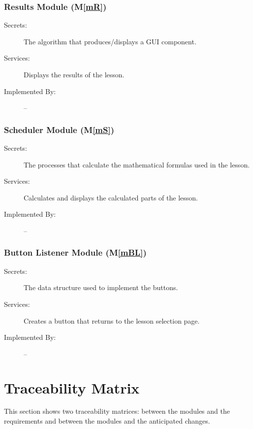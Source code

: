 \documentclass[12pt, titlepage]{article}
\newcommand{\mref}[1]{M\ref{#1}}
\begin{document}
\subsubsection{Results Module (\mref{mR})}

\begin{description}
\item[Secrets:] The algorithm that produces/displays a GUI component.
\item[Services:] Displays the results of the lesson.
\item[Implemented By:] --
\end{description}


\subsubsection{Scheduler Module (\mref{mS})}

\begin{description}
\item[Secrets:] The processes that calculate the mathematical formulas used in the lesson.
\item[Services:] Calculates and displays the calculated parts of the lesson.
\item[Implemented By:] --
\end{description}

\color{cyan}
\subsubsection{Button Listener Module (\mref{mBL})}
\begin{description}
\item[Secrets:] The data structure used to implement the buttons.
\item[Services:] Creates a button that returns to the lesson selection page.
\item[Implemented By:] --
\end{description}

\color{black}

\section{Traceability Matrix} \label{SecTM}

This section shows two traceability matrices: between the modules and the
requirements and between the modules and the anticipated changes.
\end{document}
